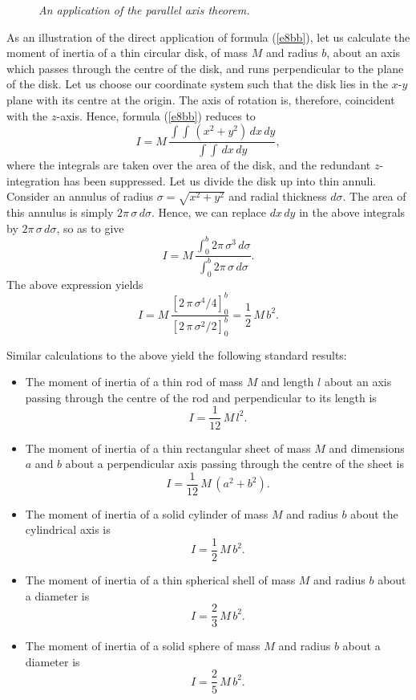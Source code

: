 \begin{figure}
\epsfysize=2in
\centerline{}
\caption{\em An application of the parallel axis theorem.}\label{f79}  
\end{figure}

As an illustration of the direct application  of formula (\ref{e8bb}), let us
calculate the moment of inertia of a thin circular disk, of mass $M$ and radius $b$,
about an axis which passes through the centre of the disk, and runs perpendicular to
the plane of the disk. Let us choose our coordinate system such that the disk
lies in the $x$-$y$ plane with its centre at the origin. The axis of rotation is, therefore,
coincident with the $z$-axis. Hence, formula (\ref{e8bb}) reduces to
\begin{equation}
I = M\,\frac{\int\!\int\, (x^2+y^2)\,dx\,dy}{\int\!\int\, dx\,dy},
\end{equation}
where the integrals are taken over the area of the disk, and the redundant $z$-integration
has been suppressed. Let us divide the disk up into thin annuli. Consider an annulus
of radius $\sigma=\sqrt{x^2+y^2}$ and radial thickness $d\sigma$. The area of this annulus is simply
$2\pi\,\sigma\,d\sigma$. Hence, we can replace $dx\,dy$ in the above integrals by
$2\pi\,\sigma\,d\sigma$, so as to give
\begin{equation}
I = M\,\frac{\int_0^b 2\pi\,\sigma^3\,d\sigma}{\int_0^b 2\pi\,\sigma\,d\sigma}.
\end{equation}
The above expression yields
\begin{equation}
I = M\,\frac{\left[2\,\pi\,\sigma^4/4\right]_0^b}{\left[2\,\pi\,\sigma^2/2\right]_0^b}=
\frac{1}{2}\,M\,b^2.
\end{equation}

Similar calculations to the above yield the following standard results:
\begin{itemize}
\item The moment of inertia of a thin rod of mass $M$ and length $l$ about an axis
passing through the centre of the rod and perpendicular to its length is 
$$
I = \frac{1}{12}\,M\,l^2.
$$
\item The moment of inertia of a thin rectangular sheet of mass $M$ and dimensions $a$ and $b$
about a perpendicular axis passing through the centre of the sheet is
$$
I = \frac{1}{12}\,M\,(a^2+b^2).
$$
\item The moment of inertia of a
solid cylinder of mass $M$ and radius $b$ about the cylindrical axis is
$$
I = \frac{1}{2}\,M\,b^2.
$$
\item The moment of inertia of a
thin spherical shell of mass $M$ and radius $b$ about a diameter is
$$
I = \frac{2}{3}\,M\,b^2.
$$
\item The moment of inertia of a
solid sphere of mass $M$ and radius $b$ about a diameter is
$$
I = \frac{2}{5}\,M\,b^2.
$$
\end{itemize}

